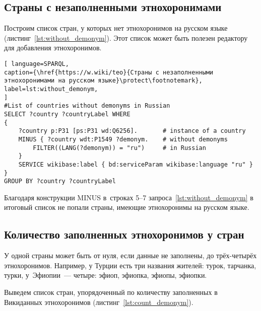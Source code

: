



\newpage
\subsection{Страны с незаполненными этнохоронимами}

Построим список стран, у которых нет этнохоронимов на русском языке (листинг~\ref{lst:without_demonym}). 
Этот список может быть полезен редактору для добавления этнохоронимов. 


\begin{lstlisting}[ language=SPARQL, 
caption={\href{https://w.wiki/teo}{Страны с незаполненными этнохоронимами на русском языке}\protect\footnotemark},
label=lst:without_demonym, 
]
#List of countries without demonyms in Russian
SELECT ?country ?countryLabel WHERE
{
	?country p:P31 [ps:P31 wd:Q6256].       # instance of a country
	MINUS { ?country wdt:P1549 ?demonym.    # without demonyms
        FILTER((LANG(?demonym)) = "ru")     # in Russian
	}
	SERVICE wikibase:label { bd:serviceParam wikibase:language "ru" }
}
GROUP BY ?country ?countryLabel
\end{lstlisting}

Благодаря конструкции MINUS в~строках 5--7 запроса~\ref{lst:without_demonym} 
в итоговый список не попали страны, имеющие этнохоронимы на русском языке.





\subsection{Количество заполненных этнохоронимов у стран}

У одной страны может быть от нуля, если данные не заполнены, до трёх-четырёх этнохоронимов. 
Например, у Турции есть три названия жителей: турок, тарчанка, турки, 
у~Эфиопии~--- четыре: эфиоп, эфиопка, эфиопы, эфиопки.

Выведем список стран, упорядоченный по количеству заполненных в Викиданных этнохоронимов (листинг~\ref{lst:count_demonym}).



